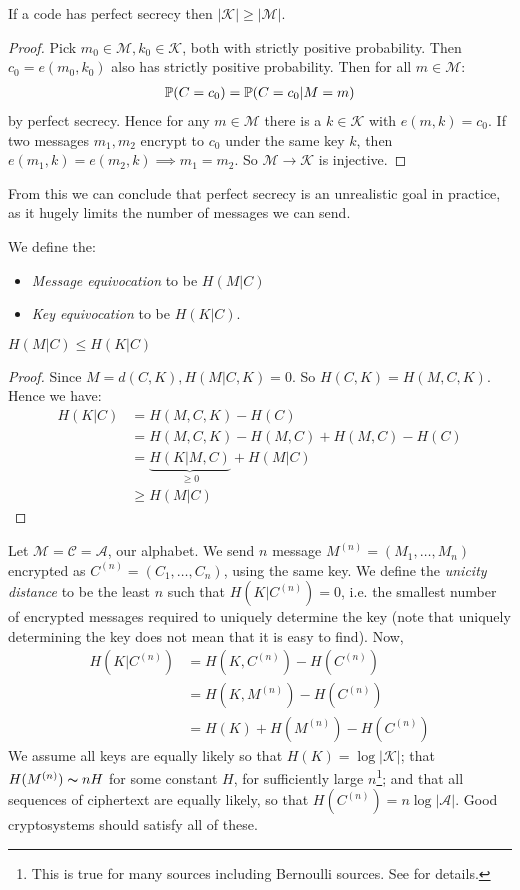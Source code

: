 \documentclass[10pt,a4paper]{article}
\begin{document}
\begin{lemma}
If a code has perfect secrecy then $|\mathcal{K}|\geq |\mathcal{M}|$.
\end{lemma} 
\begin{proof}
Pick $m_0 \in \mathcal{M}, k_0 \in \mathcal{K}$, both with strictly positive probability. Then $c_0 = e(m_0, k_0)$ also has strictly positive probability. Then for all $m \in \mathcal{M}$:
\begin{align*}
\P(C=c_0) = \P(C=c_0|M=m)
\end{align*}
by perfect secrecy. Hence for any $m \in \mathcal{M}$ there is a $k \in \mathcal{K}$ with $e(m,k) = c_0$. If two messages $m_1, m_2$ encrypt to $c_0$ under the same key $k$, then $e(m_1, k) = e(m_2,k) \implies m_1=m_2$. So $\mathcal{M} \to \mathcal{K}$ is injective.
\end{proof}
From this we can conclude that perfect secrecy is an unrealistic goal in practice, as it hugely limits the number of messages we can send.

We define the:
\begin{itemize}
\item \emph{Message equivocation} to be $H(M|C)$
\item \emph{Key equivocation} to be $H(K|C)$.
\end{itemize}
\begin{proposition}
$H(M|C) \leq H(K|C)$
\end{proposition}
\begin{proof}
Since $M = d(C, K), H(M|C, K) = 0$. So $H(C,K) = H(M,C,K)$. Hence we have:
\begin{align*}
H(K|C) &= H(M,C,K) - H(C)\\
&= H(M,C,K) - H(M,C) + H(M,C) - H(C)\\
&= \underbrace{H(K|M, C)}_{\geq 0} + H(M|C)\\
&\geq H(M|C)
\end{align*}
\end{proof}
Let $\mathcal{M} = \mathcal{C} = \mathscr{A}$, our alphabet. We send $n$ message $M^{(n)} = (M_1, \ldots, M_n)$ encrypted as $C^{(n)} = (C_1, \ldots, C_n)$, using the same key. We define the \emph{unicity distance} to be the least $n$ such that $H(K|C^{(n)}) = 0$, i.e. the smallest number of encrypted messages required to uniquely determine the key (note that uniquely determining the key does not mean that it is easy to find). Now,
\begin{align*}
H(K|C^{(n)}) &= H(K,C^{(n)}) - H(C^{(n)})\\
&= H(K, M^{(n)}) - H(C^{(n)})\\
&= H(K) + H(M^{(n)}) - H(C^{(n)})
\end{align*}
We assume all keys are equally likely so that $H(K) = \log |\mathcal{K}|$; that $H(M^{(n)})\thicksim nH$ for some constant $H$, for sufficiently large $n$\footnote{This is true for many sources including Bernoulli sources. See  for details.}; and that all sequences of ciphertext are equally likely, so that $H(C^{(n)}) = n\log |\mathscr{A}|$. Good cryptosystems should satisfy all of these.
\end{document}
